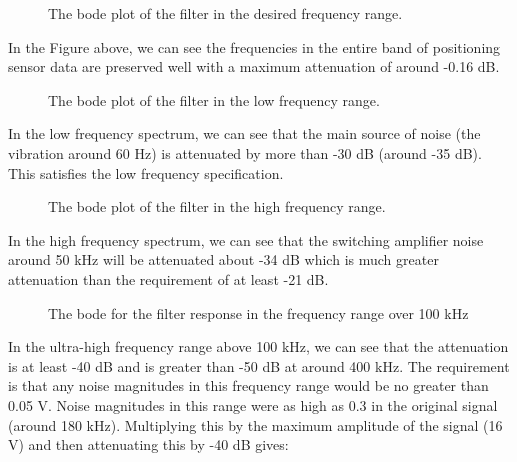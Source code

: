 \documentclass[12pt]{report}
\begin{document}
\pagebreak

    \begin{figure}[h!]
\begin{center}
\end{center}
\label{fig:bodedes}
\caption{The bode plot of the filter in the desired frequency range.}
\end{figure}

    
In the Figure above, we can see the frequencies in the entire band of
positioning sensor data are preserved well with a maximum attenuation of
around -0.16 dB.

\pagebreak

    \begin{figure}[h]
\begin{center}
\end{center}
\label{fig:lowfreqbode}
\caption{The bode plot of the filter in the low frequency range.}
\end{figure}
    
In the low frequency spectrum, we can see that the main source of noise
(the vibration around 60 Hz) is attenuated by more than -30 dB (around
-35 dB). This satisfies the low frequency specification.

\pagebreak

    \begin{figure}[h]
\begin{center}
\end{center}
\label{fig:highfreqbode}
\caption{The bode plot of the filter in the high frequency range.}
\end{figure}
    
In the high frequency spectrum, we can see that the switching amplifier
noise around 50 kHz will be attenuated about -34 dB which is much
greater attenuation than the requirement of at least -21 dB.
\pagebreak

    \begin{figure}[h]
\begin{center}
\end{center}
\label{fig:uhighfreqbode}
\caption{The bode for the filter response in the frequency range over 100 kHz}
\end{figure}
    
In the ultra-high frequency range above 100 kHz, we can see that the
attenuation is at least -40 dB and is greater than -50 dB at around 400
kHz. The requirement is that any noise magnitudes in this frequency
range would be no greater than 0.05 V. Noise magnitudes in this range
were as high as 0.3 in the original signal (around 180 kHz). Multiplying this by the
maximum amplitude of the signal (16 V) and then attenuating this by -40
dB gives:
\end{document}
